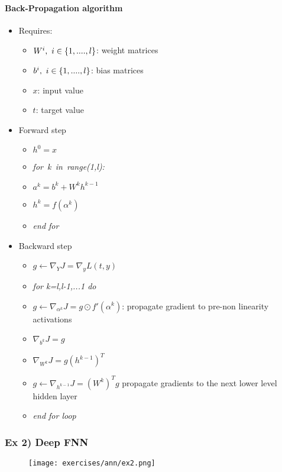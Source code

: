 \paragraph{Back-Propagation algorithm}
\begin{itemize}
\item Requires:
	\begin{itemize}
	\item $W^i,\ i\in \lbrace{1,....,l}\rbrace$: weight matrices
	\item $b^i,\ i\in \lbrace{1,....,l}\rbrace$: bias matrices
	\item $x$: input value
	\item $t$: target value
	\end{itemize}
\item Forward step

\begin{itemize}
\item $h^0=x$
\item \textit{for\ k\ in\ range(1,l):}
\item $a^k=b^k+W^kh^{k-1}$
\item $h^k=f(\alpha^k)$
\item \textit{end for}
\end{itemize}

\item Backward step

\begin{itemize}
	\item $g \leftarrow \nabla_YJ=\nabla_yL(t,y)$
	\item \textit{for k=l,l-1,...1 do}
	\item $g \leftarrow \nabla_{\alpha^k}J=g \odot f' (\alpha^k)$: propagate gradient to pre-non linearity activations
	\item $\nabla_{b^k}J=g$
	\item $\nabla_{W^k}J=g(h^{k-1})^T$
	\item $g \leftarrow \nabla_{h^{k-1}}J=(W^k)^Tg$ propagate gradients to the next lower level hidden layer
	\item \textit{end for loop}
\end{itemize}

\end{itemize}


\subsubsection{Ex 2) Deep FNN}

\begin{figure}[H]
    \centering
    \texttt{[image: exercises/ann/ex2.png]}
\end{figure}


